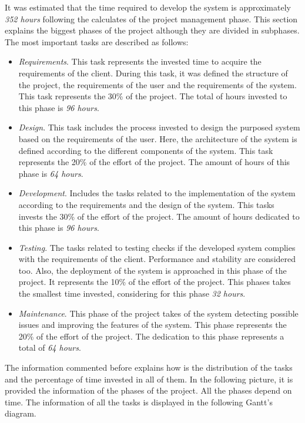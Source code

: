 It was estimated that the time required to develop the system is approximately \textit{352 hours} following the calculates of the project management phase. This section explains the biggest phases of the project although they are divided in subphases. The most important tasks are described as follows:

\begin{itemize}

\item \textit{Requirements}. This task represents the invested time to acquire the requirements of the client. During this task, it was defined the structure of the project, the requirements of the user and the requirements of the system. This task represents the 30\% of the project. The total of hours invested to this phase is \textit{96 hours}.
\item \textit{Design}. This task includes the process invested to design the purposed system based on the requirements of the user. Here, the architecture of the system is defined according to the different components of the system. This task represents the 20\% of the effort of the project. The amount of hours of this phase is \textit{64 hours}.
\item \textit{Development}. Includes the tasks related to the implementation of the system according to the requirements and the design of the system. This tasks invests the 30\% of the effort of the project. The amount of hours dedicated to this phase is \textit{96 hours}.
\item \textit{Testing}. The tasks related to testing checks if the developed system complies with the requirements of the client. Performance and stability are considered too. Also, the deployment of the system is approached in this phase of the project. It represents the 10\% of the effort of the project. This phases takes the smallest time invested, considering for this phase \textit{32 hours}.
\item \textit{Maintenance}. This phase of the project takes of the system detecting possible issues and improving the features of the system. This phase represents the 20\% of the effort of the project. The dedication to this phase represents a total of \textit{64 hours}.

\end{itemize}

The information commented before explains how is the distribution of the tasks and the percentage of time invested in all of them. In the following picture, it is provided the information of the phases of the project. All the phases depend on time. The information of all the tasks is displayed in the following Gantt's diagram.\\

